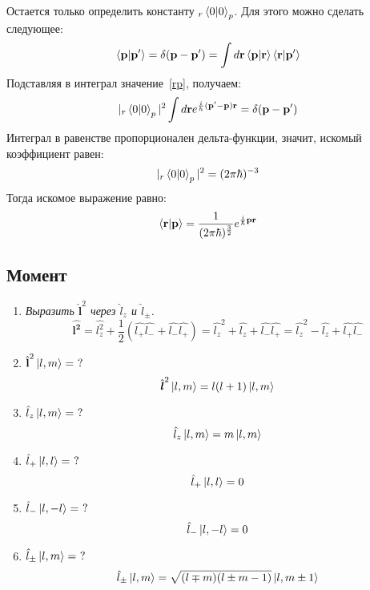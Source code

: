\documentclass{article}
\begin{document}
\begin{enumerate}
\begin{equation}
	\end{equation}
	Остается только определить константу $_r\braket{0|0}_p$. Для этого можно сделать следующее:
	\begin{equation}
		\braket{\textbf{p}|\textbf{p}'} = \delta(\textbf{p} - \textbf{p}') = \int d\textbf{r} \braket{\textbf{p}|\textbf{r}}\braket{\textbf{r}|\textbf{p}'}
	\end{equation}
	Подставляя в интеграл значение~\eqref{rp}, получаем:
	\begin{equation}
		|_r\braket{0|0}_p|^2 \int d\textbf{r} e^{\frac{i}{h}(\textbf{p}' - \textbf{p})\textbf{r}} = \delta(\textbf{p} - \textbf{p}')
	\end{equation}
	Интеграл в равенстве пропорционален дельта-функции, значит, искомый коэффициент равен:
	\begin{equation}
		|_r\braket{0|0}_p|^2 = (2\pi\hbar)^{-3}
	\end{equation}
	Тогда искомое выражение равно:
	\begin{equation}
		\braket{\textbf{r}|\textbf{p}} = \frac{1}{(2\pi\hbar)^{\frac{3}{2}}} e^{\frac{i}{\hbar}\textbf{pr}}
	\end{equation}
\end{enumerate}

\subsection*{Момент}
	\begin{enumerate}
		\item \textit{Выразить $\hat{\textbf{l}}^2$ через $\hat{l}_z$ и $\hat{l}_\pm$.}	
		\begin{equation}
			\hat{\boldsymbol{l^{2}}}=\hat{l_{z}^{2}}+\frac{1}{2}(\hat{l_{+}}\hat{l_{-}}+\hat{l_{-}}\hat{l_{+}})=\hat{l_{z}}^{2}+\hat{l_{z}}+\hat{l_{-}}\hat{l_{+}}=\hat{l_{z}}^{2}-\hat{l_{z}}+\hat{l_{+}}\hat{l_{-}}
		\end{equation}
		\item \textit{$\hat{\textbf{l}}^2 \ket{l, m} = \ ?$}
		\begin{equation}
			\hat{\boldsymbol{l}}^2\ket{l,m}=l(l+1)\ket{l,m}
		\end{equation}			
		\item \textit{$\hat{l}_z \ket{l, m} = \ ?$}
		\begin{equation}
			\hat{l}_z\ket{l,m}=m\ket{l,m}
		\end{equation}	
		\item \textit{$\hat{l}_+ \ket{l, l} = \ ?$}
		\begin{equation}
			\hat{l}_+\ket{l,l}=0
		\end{equation}	
		\item \textit{$\hat{l}_- \ket{l, -l} = \ ?$}
		\begin{equation}
			\hat{l}_-\ket{l,-l}=0
		\end{equation}		
		\item \textit{$\hat{l}_\pm \ket{l, m} = \ ?$}
		\begin{equation}
			\hat{l}_\pm\ket{l,m}=\sqrt{(l\mp m)(l\pm m-1)}\ket{l,m\pm1}
		\end{equation}	
	\end{enumerate}
\end{document}
